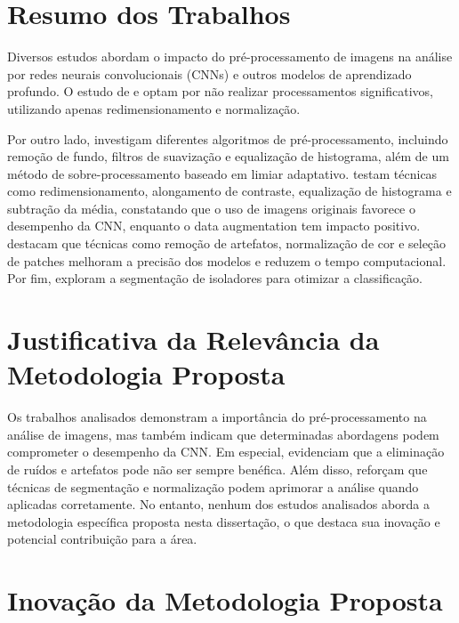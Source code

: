 \section{Resumo dos Trabalhos}

Diversos estudos abordam o impacto do pré-processamento de imagens na análise por redes neurais convolucionais (CNNs) e outros modelos de aprendizado profundo. O estudo de  e  optam por não realizar processamentos significativos, utilizando apenas redimensionamento e normalização.

Por outro lado,  investigam diferentes algoritmos de pré-processamento, incluindo remoção de fundo, filtros de suavização e equalização de histograma, além de um método de sobre-processamento baseado em limiar adaptativo.  testam técnicas como redimensionamento, alongamento de contraste, equalização de histograma e subtração da média, constatando que o uso de imagens originais favorece o desempenho da CNN, enquanto o data augmentation tem impacto positivo.  destacam que técnicas como remoção de artefatos, normalização de cor e seleção de patches melhoram a precisão dos modelos e reduzem o tempo computacional. Por fim,  exploram a segmentação de isoladores para otimizar a classificação.

\section{Justificativa da Relevância da Metodologia Proposta}

Os trabalhos analisados demonstram a importância do pré-processamento na análise de imagens, mas também indicam que determinadas abordagens podem comprometer o desempenho da CNN. Em especial,  evidenciam que a eliminação de ruídos e artefatos pode não ser sempre benéfica. Além disso,  reforçam que técnicas de segmentação e normalização podem aprimorar a análise quando aplicadas corretamente. No entanto, nenhum dos estudos analisados aborda a metodologia específica proposta nesta dissertação, o que destaca sua inovação e potencial contribuição para a área.

\section{Inovação da Metodologia Proposta}

